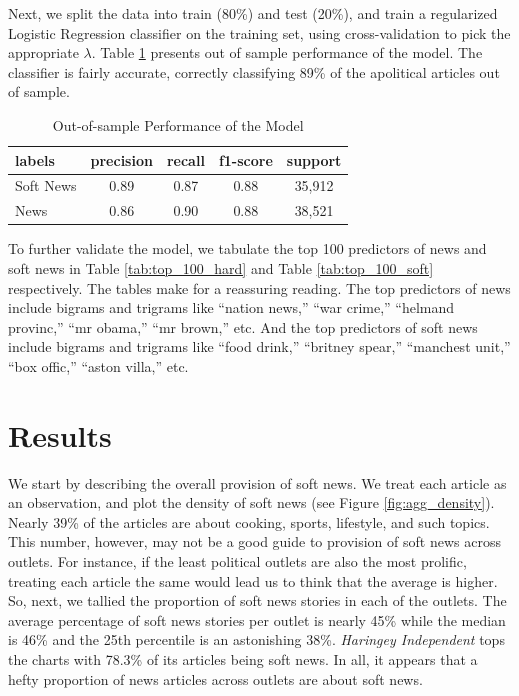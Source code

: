 \documentclass[12pt, letterpaper]{article}
\begin{document}
Next, we split the data into train (80\%) and test (20\%), and train a regularized Logistic Regression classifier \citep{zou2005regularization} on the training set, using cross-validation to pick the appropriate $\lambda$. Table \ref{tab:url_conf_matrix} presents out of sample performance of the model. The classifier is fairly accurate, correctly classifying 89\% of the apolitical articles out of sample.

\begin{table}[!htb]
\centering
\caption{Out-of-sample Performance of the Model} 
\label{tab:url_conf_matrix}
\begin{tabular}{lcccc}
\hline
labels & precision   &  recall  &   f1-score  &   support \\
\hline
Soft News      & 0.89    &   0.87    &   0.88   &    35,912 \\
News          & 0.86    &   0.90    &   0.88   &    38,521 \\
\hline
\end{tabular}
\end{table}

To further validate the model, we tabulate the top 100 predictors of news and soft news in Table \ref{tab:top_100_hard} and Table \ref{tab:top_100_soft} respectively. The tables make for a reassuring reading. The top predictors of news include bigrams and trigrams like ``nation news,'' ``war crime,'' ``helmand provinc,'' ``mr obama,'' ``mr brown,'' etc. And the top predictors of soft news include bigrams and trigrams like ``food drink,'' ``britney spear,'' ``manchest unit,'' ``box offic,'' ``aston villa,'' etc.  

\singlespacing



\clearpage


\doublespacing

\section*{Results}
We start by describing the overall provision of soft news. We treat each article as an observation, and plot the density of soft news (see Figure \ref{fig:agg_density}).  Nearly 39\% of the articles are about cooking, sports, lifestyle, and such topics. This number, however, may not be a good guide to provision of soft news across outlets. For instance, if the least political outlets are also the most prolific, treating each article the same would lead us to think that the average is higher. So, next, we tallied the proportion of soft news stories in each of the outlets. The average percentage of soft news stories per outlet is nearly 45\% while the median is 46\% and the 25th percentile is an astonishing 38\%. \textit{Haringey Independent} tops the charts with 78.3\% of its articles being soft news. In all, it appears that a hefty proportion of news articles across outlets are about soft news.
\end{document}
